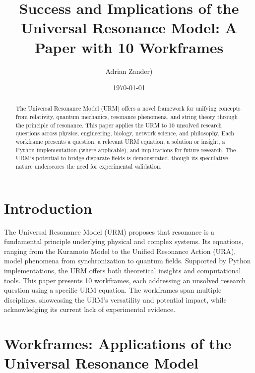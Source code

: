 \documentclass[12pt]{article}
\title{Success and Implications of the Universal Resonance Model: A Paper with 10 Workframes}
\author{Adrian Zander)}
\date{\today}
\begin{document}
\maketitle

\begin{abstract}
The Universal Resonance Model (URM) offers a novel framework for unifying concepts from relativity, quantum mechanics, resonance phenomena, and string theory through the principle of resonance. This paper applies the URM to 10 unsolved research questions across physics, engineering, biology, network science, and philosophy. Each workframe presents a question, a relevant URM equation, a solution or insight, a Python implementation (where applicable), and implications for future research. The URM's potential to bridge disparate fields is demonstrated, though its speculative nature underscores the need for experimental validation.
\end{abstract}

\clearpage
\section{Introduction}
The Universal Resonance Model (URM) proposes that resonance is a fundamental principle underlying physical and complex systems. Its equations, ranging from the Kuramoto Model to the Unified Resonance Action (URA), model phenomena from synchronization to quantum fields. Supported by Python implementations, the URM offers both theoretical insights and computational tools. This paper presents 10 workframes, each addressing an unsolved research question using a specific URM equation. The workframes span multiple disciplines, showcasing the URM's versatility and potential impact, while acknowledging its current lack of experimental evidence.

\clearpage
\section{Workframes: Applications of the Universal Resonance Model}
\end{document}
